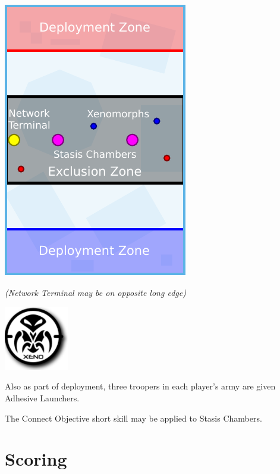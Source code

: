 \begin{minipage}[t]{2in}\centering
\vspace{4pt}   
\includegraphics{maps/map-bio}

\medskip\small%
\emph{(Network Terminal may be on opposite long edge)}


\smallskip
\centerline{\includegraphics[height=1.1in]{art/icons/xeno}}

\end{minipage}

\medskip%
Also as part of deployment, three troopers in each player's army are
given Adhesive Launchers.

The Connect Objective short skill may be applied to Stasis Chambers.

\vspace*{-8pt}
\section{Scoring}

